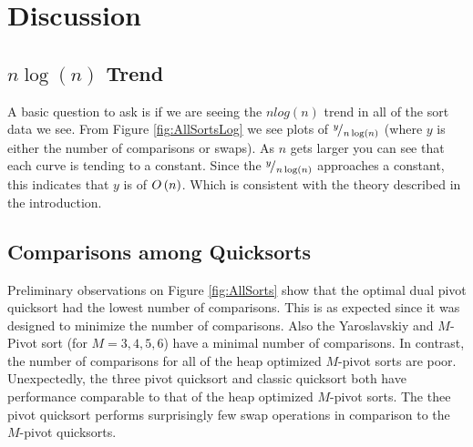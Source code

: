 		

\section{Discussion}
	\label{sec:Discussion}
	\subsection{$n\log(n)$ Trend}
		
		A basic question to ask is if we are seeing the $n log(n)$ trend in all of the sort data we see. From Figure \ref{fig:AllSortsLog} we see plots of ${}^{y}\!/_{n \log(n)}$ (where $y$ is either the number of comparisons or swaps). As $n$ gets larger you can see that each curve is tending to a constant. Since the ${}^{y}\!/_{n \log(n)}$ approaches a constant, this indicates that $y$ is of $O\left(n\right)$. Which is consistent with the theory described in the introduction.
		

	\subsection{Comparisons among Quicksorts}
	
		Preliminary observations on Figure \ref{fig:AllSorts} show that the optimal dual pivot quicksort had the lowest number of comparisons. This is as expected since it was designed to minimize the number of comparisons. Also the Yaroslavskiy and $M$-Pivot sort (for $M=3,4,5,6$) have a minimal number of comparisons. In contrast, the number of comparisons for all of the heap optimized $M$-pivot sorts are poor. Unexpectedly, the three pivot quicksort and classic quicksort both have performance comparable to that of the heap optimized $M$-pivot sorts. The thee pivot quicksort performs surprisingly few swap operations in comparison to the $M$-pivot quicksorts. 
		
